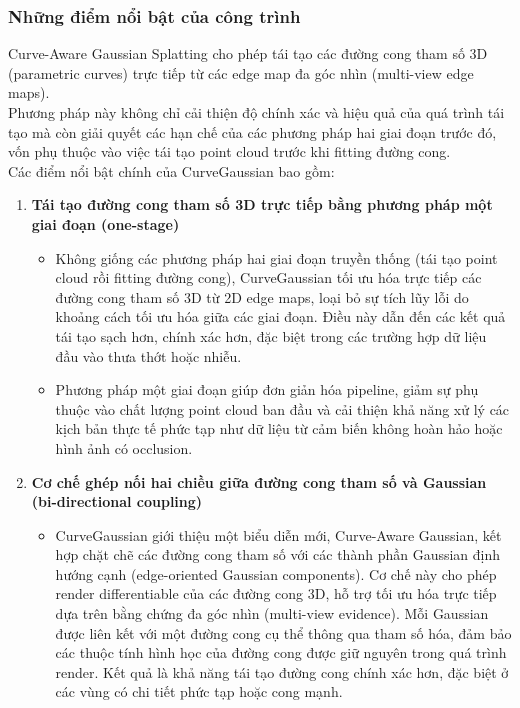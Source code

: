 \subsubsection{Những điểm nổi bật của công trình}
Curve-Aware Gaussian Splatting cho phép tái tạo các đường cong tham số 3D (parametric curves) trực tiếp từ các edge map đa góc nhìn (multi-view edge maps). \\

Phương pháp này không chỉ cải thiện độ chính xác và hiệu quả của quá trình tái tạo mà còn giải quyết các hạn chế của các phương pháp hai giai đoạn trước đó, vốn phụ thuộc vào việc tái tạo point cloud trước khi fitting đường cong. \\

Các điểm nổi bật chính của CurveGaussian bao gồm:
\begin{enumerate}
    \item \textbf{Tái tạo đường cong tham số 3D trực tiếp bằng phương pháp một giai đoạn (one-stage)}
    \begin{itemize}
        \item Không giống các phương pháp hai giai đoạn truyền thống (tái tạo point cloud rồi fitting đường cong), CurveGaussian tối ưu hóa trực tiếp các đường cong tham số 3D từ 2D edge maps, loại bỏ sự tích lũy lỗi do khoảng cách tối ưu hóa giữa các giai đoạn. Điều này dẫn đến các kết quả tái tạo sạch hơn, chính xác hơn, đặc biệt trong các trường hợp dữ liệu đầu vào thưa thớt hoặc nhiễu.
        \item Phương pháp một giai đoạn giúp đơn giản hóa pipeline, giảm sự phụ thuộc vào chất lượng point cloud ban đầu và cải thiện khả năng xử lý các kịch bản thực tế phức tạp như dữ liệu từ cảm biến không hoàn hảo hoặc hình ảnh có occlusion.
    \end{itemize}
    \item \textbf{Cơ chế ghép nối hai chiều giữa đường cong tham số và Gaussian (bi-directional coupling)}
    \begin{itemize}
        \item CurveGaussian giới thiệu một biểu diễn mới, Curve-Aware Gaussian, kết hợp chặt chẽ các đường cong tham số với các thành phần Gaussian định hướng cạnh (edge-oriented Gaussian components). Cơ chế này cho phép render differentiable của các đường cong 3D, hỗ trợ tối ưu hóa trực tiếp dựa trên bằng chứng đa góc nhìn (multi-view evidence). Mỗi Gaussian được liên kết với một đường cong cụ thể thông qua tham số hóa, đảm bảo các thuộc tính hình học của đường cong được giữ nguyên trong quá trình render. Kết quả là khả năng tái tạo đường cong chính xác hơn, đặc biệt ở các vùng có chi tiết phức tạp hoặc cong mạnh.

\end{itemize}
\end{enumerate}

